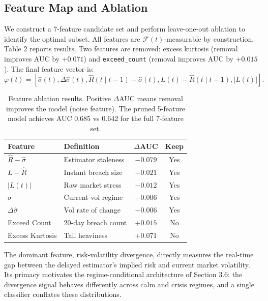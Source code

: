 \documentclass[sigconf, anonymous]{acmart}
\begin{document}
\subsection{Feature Map and Ablation}
We construct a 7-feature candidate set and perform leave-one-out ablation to identify the optimal subset. All features are $\mathcal{F}(t)$-measurable by construction. Table 2 reports results. Two features are removed: excess kurtosis (removal improves AUC by $+0.071$) and \texttt{exceed\_count} (removal improves AUC by $+0.015$). The final feature vector is:
\begin{equation}
\varphi(t) = [\hat{\sigma}(t), \Delta\hat{\sigma}(t), \hat{R}(t \mid t - 1) - \hat{\sigma}(t), L(t) - \hat{R}(t \mid t - 1), |L(t)|].
\end{equation}

\begin{table}[t]
\caption{Feature ablation results. Positive $\Delta$AUC means removal improves the model (noise feature). The pruned 5-feature model achieves AUC 0.685 vs 0.642 for the full 7-feature set.}
\label{tab:ablation}
\small
\begin{tabular}{llcc}
\toprule
\textbf{Feature} & \textbf{Definition} & $\Delta$\textbf{AUC} & \textbf{Keep} \\
\midrule
$\hat{R} - \hat{\sigma}$ & Estimator staleness & $-0.079$ & Yes \\
$L - \hat{R}$           & Instant breach size & $-0.021$ & Yes \\
$|L(t)|$                & Raw market stress   & $-0.012$ & Yes \\
$\hat{\sigma}$          & Current vol regime  & $-0.006$ & Yes \\
$\Delta\hat{\sigma}$    & Vol rate of change  & $-0.006$ & Yes \\
Exceed Count            & 20-day breach count & $+0.015$ & No \\
Excess Kurtosis         & Tail heaviness      & $+0.071$ & No \\
\bottomrule
\end{tabular}
\end{table}

The dominant feature, risk-volatility divergence, directly measures the real-time gap between the delayed estimator's implied risk and current market volatility. Its primacy motivates the regime-conditional architecture of Section 3.6: the divergence signal behaves differently across calm and crisis regimes, and a single classifier conflates these distributions.
\end{document}
